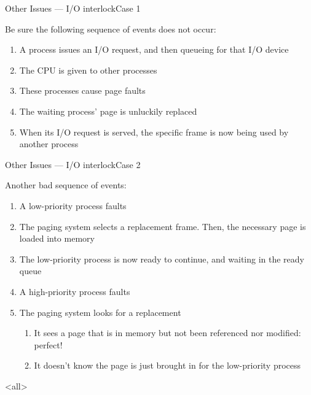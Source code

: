 \begin{frame}{Other Issues --- I/O interlock}{Case 1}
  \begin{iblock}{Be sure the following sequence of events does not occur:}
    \begin{enumerate}
    \item A process issues an I/O request, and then queueing for that I/O device
    \item The CPU is given to other processes
    \item These processes cause page faults
    \item The waiting process' page is unluckily replaced
    \item When its I/O request is served, the specific frame is now being used by another
      process
    \end{enumerate}
  \end{iblock}
\end{frame}

\begin{frame}{Other Issues --- I/O interlock}{Case 2}
  
  \begin{iblock}{Another bad sequence of events:}
    \begin{enumerate}
    \item A low-priority process faults
    \item The paging system selects a replacement frame. Then, the necessary page is
      loaded into memory
    \item The low-priority process is now ready to continue, and waiting in the ready
      queue
    \item A high-priority process faults
    \item The paging system looks for a replacement
      \begin{enumerate}
      \item It sees a page that is in memory but not been referenced nor modified:
        perfect!
      \item It doesn't know the page is just brought in for the low-priority process
      \end{enumerate}
    \end{enumerate}
  \end{iblock}
\end{frame}

\begin{frame}
  \begin{refsection}
    \nocite{wiki:mm, wiki:vm}
    \printbibliography[heading=none]
  \end{refsection}
\end{frame}

\mode<all>
